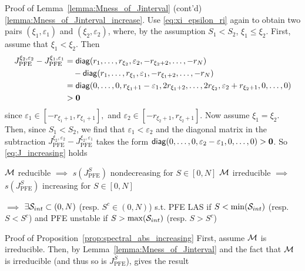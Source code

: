 \documentclass[aspectratio=169]{beamer}
\begin{document}
\begin{frame}{Proof of Lemma~\ref{lemma:Mness_of_Jinterval} (cont'd)}
	\ref{lemma:Mness_of_Jinterval_increase}. Use \eqref{eq:xi_epsilon_ri} again to obtain two pairs $(\xi_1,\varepsilon_1)$ and $(\xi_2,\varepsilon_2)$, where, by the assumption $S_1<S_2$, $\xi_1\leq\xi_2$. First, assume that $\xi_1<\xi_2$. Then
	\begin{align*}
	J_{\textrm{PFE}}^{\xi_2,\varepsilon_2}-J_{\textrm{PFE}}^{\xi_1,\varepsilon_1} 
	&= \diag(r_1,\ldots,r_{\xi_2},\varepsilon_2,-r_{\xi_2+2},\ldots,-r_N) \\
	&\quad -
	\diag(r_1,\ldots,r_{\xi_1},\varepsilon_1,-r_{\xi_1+2},\ldots,-r_N) \\
	&= \diag(0,\ldots,0,r_{\xi_1+1}-\varepsilon_1,
	2r_{\xi_1+2},
	\ldots,
	2r_{\xi_2},\varepsilon_2+r_{\xi_2+1},0,\ldots,0) \\
	&>\b0
	\end{align*}
	since $\varepsilon_1 \in[-r_{\xi_1+1},r_{\xi_1+1}],$ and $\varepsilon_2\in[-r_{\xi_2+1},r_{\xi_2+1}]$. Now assume $\xi_1=\xi_2$. Then, since $S_1<S_2$, we find that $\varepsilon_1<\varepsilon_2$ and the diagonal matrix in the subtraction $J_{\textrm{PFE}}^{\xi_2,\varepsilon_2}-J_{\textrm{PFE}}^{\xi_2,\varepsilon_1}$ takes the form $\diag(0,\ldots,0,\varepsilon_2-\varepsilon_1,0,\ldots,0)>\b0$. So \eqref{eq:J_increasing} holds
\end{frame}


\begin{frame}
	\begin{proposition}\label{prop:spectral_abs_increasing}
		$\M$ reducible $\implies$ $s(J_{\textrm{PFE}}^S)$ nondecreasing for $S\in[0,N]$
		\vskip0.2cm
		$\M$ irreducible $\implies$ $s(J_{\textrm{PFE}}^S)$ increasing for $S\in[0,N]$
	\end{proposition}
	\vfill
	$\implies$ $\exists \S_{int}\subset(0,N)$ (resp. $S^c\in(0,N)$) s.t. PFE LAS if $S<\min(\S_{int})$ (resp. $S<S^c$) and PFE unstable if $S>\max(\S_{int})$ (resp. $S>S^c$)
\end{frame}

\begin{frame}{Proof of Proposition~\ref{prop:spectral_abs_increasing}}
	First, assume $\M$ is irreducible. Then, by Lemma~\ref{lemma:Mness_of_Jinterval} and the fact that $\M$ is irreducible (and thus so is $J_{\textrm{PFE}}^S$), \cite[Corollary 4.3.2(3)]{Smith1995} gives the result
\end{frame}
\end{document}

